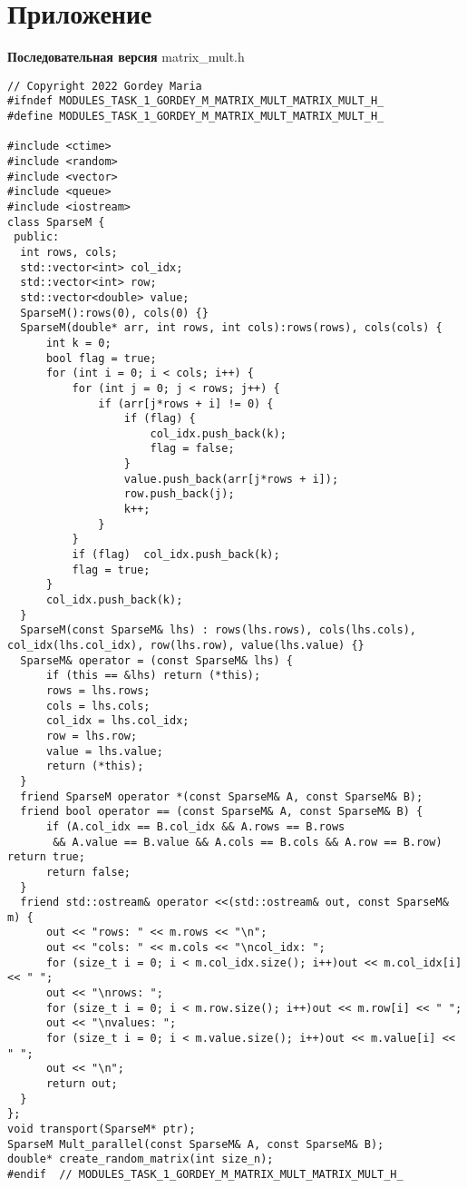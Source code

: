 \documentclass{report}
\begin{document}
\section*{Приложение}
\textbf{Последовательная версия}
\newline
\newline matrix\_mult.h
\begin{lstlisting}
// Copyright 2022 Gordey Maria
#ifndef MODULES_TASK_1_GORDEY_M_MATRIX_MULT_MATRIX_MULT_H_
#define MODULES_TASK_1_GORDEY_M_MATRIX_MULT_MATRIX_MULT_H_

#include <ctime>
#include <random>
#include <vector>
#include <queue>
#include <iostream>
class SparseM {
 public:
  int rows, cols;
  std::vector<int> col_idx;
  std::vector<int> row;
  std::vector<double> value;
  SparseM():rows(0), cols(0) {}
  SparseM(double* arr, int rows, int cols):rows(rows), cols(cols) {
      int k = 0;
      bool flag = true;
      for (int i = 0; i < cols; i++) {
          for (int j = 0; j < rows; j++) {
              if (arr[j*rows + i] != 0) {
                  if (flag) {
                      col_idx.push_back(k);
                      flag = false;
                  }
                  value.push_back(arr[j*rows + i]);
                  row.push_back(j);
                  k++;
              }
          }
          if (flag)  col_idx.push_back(k);
          flag = true;
      }
      col_idx.push_back(k);
  }
  SparseM(const SparseM& lhs) : rows(lhs.rows), cols(lhs.cols), col_idx(lhs.col_idx), row(lhs.row), value(lhs.value) {}
  SparseM& operator = (const SparseM& lhs) {
      if (this == &lhs) return (*this);
      rows = lhs.rows;
      cols = lhs.cols;
      col_idx = lhs.col_idx;
      row = lhs.row;
      value = lhs.value;
      return (*this);
  }
  friend SparseM operator *(const SparseM& A, const SparseM& B);
  friend bool operator == (const SparseM& A, const SparseM& B) {
      if (A.col_idx == B.col_idx && A.rows == B.rows
       && A.value == B.value && A.cols == B.cols && A.row == B.row) return true;
      return false;
  }
  friend std::ostream& operator <<(std::ostream& out, const SparseM& m) {
      out << "rows: " << m.rows << "\n";
      out << "cols: " << m.cols << "\ncol_idx: ";
      for (size_t i = 0; i < m.col_idx.size(); i++)out << m.col_idx[i] << " ";
      out << "\nrows: ";
      for (size_t i = 0; i < m.row.size(); i++)out << m.row[i] << " ";
      out << "\nvalues: ";
      for (size_t i = 0; i < m.value.size(); i++)out << m.value[i] << " ";
      out << "\n";
      return out;
  }
};
void transport(SparseM* ptr);
SparseM Mult_parallel(const SparseM& A, const SparseM& B);
double* create_random_matrix(int size_n);
#endif  // MODULES_TASK_1_GORDEY_M_MATRIX_MULT_MATRIX_MULT_H_

\end{lstlisting}
\end{document}
